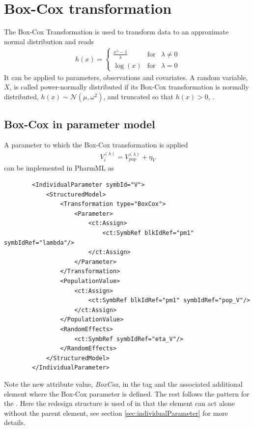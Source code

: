\section{Box-Cox transformation}
\label{sec:BoxCoxTrafo}
The Box-Cox Transformation \cite{BoxCox:1964} is used to transform data to an approximate normal distribution
and reads
\begin{align}
h(x) = \left\{ \begin{array}{rcl}  \frac{x^{\lambda} -1}{\lambda} & \mbox{for} & \lambda \neq 0 \\  \log(x) & \mbox{for} & \lambda = 0 \end{array}\right. \nonumber
\end{align}
It can be applied to parameters, observations and covariates. 
A random variable, $X$, is called power-normally distributed if its 
Box-Cox transformation is normally distributed, $h(x) \sim \mathcal {N} (\mu,\omega^2)$, 
and truncated so that $h(x) > 0$, \cite{LavielleBook:2014}.

\subsection{Box-Cox in parameter model}
A parameter to which the Box-Cox transformation is applied 
\begin{align*}
        V_{i}^{(\lambda)} = V_{pop}^{(\lambda)} + \eta_V
\end{align*}
can be implemented in PharmML as
\lstset{language=XML}
\begin{lstlisting}
        <IndividualParameter symbId="V">
            <StructuredModel>
                <Transformation type="BoxCox">
                    <Parameter>
                        <ct:Assign>
                            <ct:SymbRef blkIdRef="pm1" symbIdRef="lambda"/>
                        </ct:Assign>
                    </Parameter>
                </Transformation>
                <PopulationValue>
                    <ct:Assign>
                        <ct:SymbRef blkIdRef="pm1" symbIdRef="pop_V"/>
                    </ct:Assign>
                </PopulationValue>
                <RandomEffects>
                    <ct:SymbRef symbIdRef="eta_V"/>
                </RandomEffects>
            </StructuredModel>
        </IndividualParameter>
 \end{lstlisting}
Note the new  attribute value, \emph{BoxCox}, in the  
tag and the associated additional element  where the Box-Cox 
parameter is defined. The rest follows the pattern for the .
Here the redesign structure is used of  in that the 
 element can act alone without the  
parent element, see section \ref{sec:individualParameter}
for more details.

